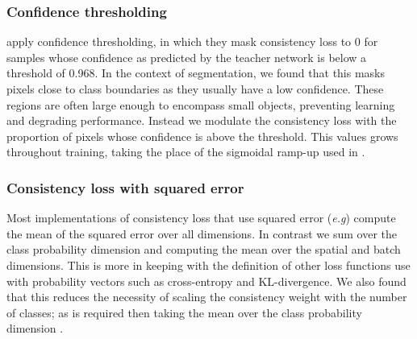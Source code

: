 \documentclass{bmvc2k}
\def\eg{\emph{e.g}\bmvaOneDot}
\begin{document}
\subsubsection{Confidence thresholding}

\cite{French:SelfEnsDomAdapt} apply confidence thresholding, in which they mask consistency loss to 0 for samples whose confidence as predicted by the teacher network is below a threshold of 0.968. In the context of segmentation, we found that this masks pixels close to class boundaries as they usually have a low confidence. These regions are often large enough to encompass small objects, preventing learning and degrading performance. Instead we modulate the consistency loss with the proportion of pixels whose confidence is above the threshold. This values grows throughout training, taking the place of the sigmoidal ramp-up used in \cite{Laine:Temporal, Tarvainen:MeanTeachers}.


\subsubsection{Consistency loss with squared error}

Most implementations of consistency loss that use squared error (\eg \cite{Tarvainen:MeanTeachers}) compute the mean of the squared error over all dimensions.
In contrast we sum over the class probability dimension and computing the mean over the spatial and batch dimensions.
This is more in keeping with the definition of other loss functions use with probability vectors such as cross-entropy and KL-divergence.
We also found that this reduces the necessity of scaling the consistency weight with the number of classes; as is required then taking the mean over the class probability dimension \cite{Tarvainen:MeanTeachers}.
\end{document}
